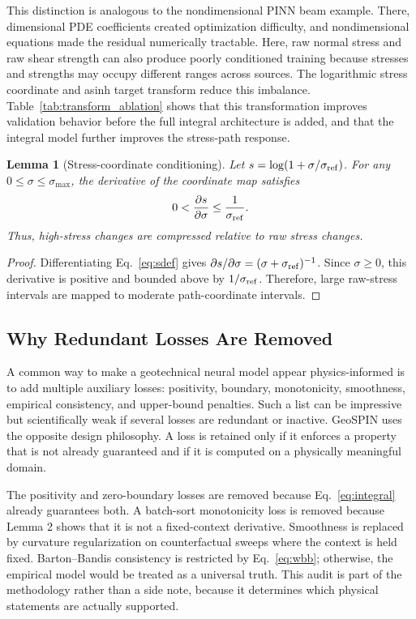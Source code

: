 \documentclass[journal]{IEEEtran}
\newtheorem{lemma}{Lemma}
\begin{document}
This distinction is analogous to the nondimensional PINN beam example. There, dimensional PDE coefficients created optimization difficulty, and nondimensional equations made the residual numerically tractable. Here, raw normal stress and raw shear strength can also produce poorly conditioned training because stresses and strengths may occupy different ranges across sources. The logarithmic stress coordinate and asinh target transform reduce this imbalance. Table~\ref{tab:transform_ablation} shows that this transformation improves validation behavior before the full integral architecture is added, and that the integral model further improves the stress-path response.

\begin{lemma}[Stress-coordinate conditioning]
Let $s=\log(1+\sigma/\sigma_{\rm ref})$. For any $0\le\sigma\le\sigma_{\max}$, the derivative of the coordinate map satisfies
\begin{equation}
0<\frac{\partial s}{\partial\sigma}\le \frac{1}{\sigma_{\rm ref}}.
\end{equation}
Thus, high-stress changes are compressed relative to raw stress changes.
\end{lemma}

\begin{proof}
Differentiating Eq.~\eqref{eq:sdef} gives $\partial s/\partial\sigma=(\sigma+\sigma_{\rm ref})^{-1}$. Since $\sigma\ge0$, this derivative is positive and bounded above by $1/\sigma_{\rm ref}$. Therefore, large raw-stress intervals are mapped to moderate path-coordinate intervals.
\end{proof}

\subsection{Why Redundant Losses Are Removed}
A common way to make a geotechnical neural model appear physics-informed is to add multiple auxiliary losses: positivity, boundary, monotonicity, smoothness, empirical consistency, and upper-bound penalties. Such a list can be impressive but scientifically weak if several losses are redundant or inactive. GeoSPIN uses the opposite design philosophy. A loss is retained only if it enforces a property that is not already guaranteed and if it is computed on a physically meaningful domain.

The positivity and zero-boundary losses are removed because Eq.~\eqref{eq:integral} already guarantees both. A batch-sort monotonicity loss is removed because Lemma 2 shows that it is not a fixed-context derivative. Smoothness is replaced by curvature regularization on counterfactual sweeps where the context is held fixed. Barton--Bandis consistency is restricted by Eq.~\eqref{eq:wbb}; otherwise, the empirical model would be treated as a universal truth. This audit is part of the methodology rather than a side note, because it determines which physical statements are actually supported.
\end{document}
